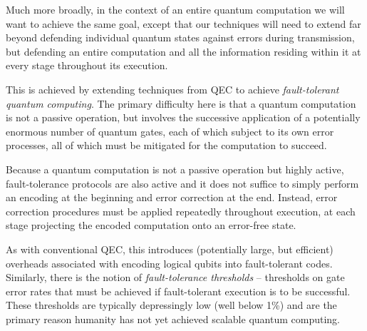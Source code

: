 Much more broadly, in the context of an entire quantum computation we will want to achieve the same goal, except that our techniques will need to extend far beyond defending individual quantum states against errors during transmission, but defending an entire computation and all the information residing within it at every stage throughout its execution.

This is achieved by extending techniques from QEC to achieve \textit{fault-tolerant quantum computing}. The primary difficulty here is that a quantum computation is not a passive operation, but involves the successive application of a potentially enormous number of quantum gates, each of which subject to its own error processes, all of which must be mitigated for the computation to succeed.

Because a quantum computation is not a passive operation but highly active, fault-tolerance protocols are also active and it does not suffice to simply perform an encoding at the beginning and error correction at the end. Instead, error correction procedures must be applied repeatedly throughout execution, at each stage projecting the encoded computation onto an error-free state.

As with conventional QEC, this introduces (potentially large, but efficient) overheads associated with encoding logical qubits into fault-tolerant codes. Similarly, there is the notion of \textit{fault-tolerance thresholds} -- thresholds on gate error rates that must be achieved if fault-tolerant execution is to be successful. These thresholds are typically depressingly low (well below 1\%) and are the primary reason humanity has not yet achieved scalable quantum computing.